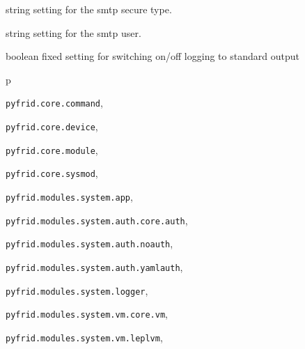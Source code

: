 \documentclass[letterpaper,10pt,english]{sphinxmanual}
\begin{document}
\begin{fulllineitems}
\begin{fulllineitems}
\label{sysmod:pyfrid.modules.system.logger.BaseLoggerModule.smtp_secure}
string setting for the smtp secure type.

\end{fulllineitems}


\begin{fulllineitems}
\label{sysmod:pyfrid.modules.system.logger.BaseLoggerModule.smtp_user}
string setting for the smtp user.

\end{fulllineitems}


\begin{fulllineitems}
\label{sysmod:pyfrid.modules.system.logger.BaseLoggerModule.stdout_log}
boolean fixed setting for switching on/off logging to standard output

\end{fulllineitems}


\end{fulllineitems}



\renewcommand{\indexname}{Python Module Index}
\begin{theindex}
\def\bigletter#1{{\Large\sffamily#1}\nopagebreak\vspace{1mm}}
\bigletter{p}
\item {\texttt{pyfrid.core.command}}, \pageref{command:module-pyfrid.core.command}
\item {\texttt{pyfrid.core.device}}, \pageref{device:module-pyfrid.core.device}
\item {\texttt{pyfrid.core.module}}, \pageref{module:module-pyfrid.core.module}
\item {\texttt{pyfrid.core.sysmod}}, \pageref{sysmod:module-pyfrid.core.sysmod}
\item {\texttt{pyfrid.modules.system.app}}, \pageref{sysmod:module-pyfrid.modules.system.app}
\item {\texttt{pyfrid.modules.system.auth.core.auth}}, \pageref{sysmod:module-pyfrid.modules.system.auth.core.auth}
\item {\texttt{pyfrid.modules.system.auth.noauth}}, \pageref{sysmod:module-pyfrid.modules.system.auth.noauth}
\item {\texttt{pyfrid.modules.system.auth.yamlauth}}, \pageref{sysmod:module-pyfrid.modules.system.auth.yamlauth}
\item {\texttt{pyfrid.modules.system.logger}}, \pageref{sysmod:module-pyfrid.modules.system.logger}
\item {\texttt{pyfrid.modules.system.vm.core.vm}}, \pageref{sysmod:module-pyfrid.modules.system.vm.core.vm}
\item {\texttt{pyfrid.modules.system.vm.leplvm}}, \pageref{sysmod:module-pyfrid.modules.system.vm.leplvm}
\end{theindex}

\renewcommand{\indexname}{Index}
\printindex
\end{document}
